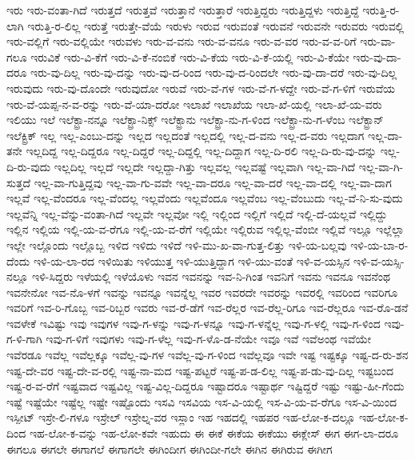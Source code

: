 {ಇರು
ಇರು-ವಂತಾ-ಗಿದೆ
ಇರುತ್ತದೆ
ಇರುತ್ತವೆ
ಇರುತ್ತಾನೆ
ಇರುತ್ತಾರೆ
ಇರುತ್ತಿದ್ದರು
ಇರುತ್ತಿದ್ದಳು
ಇರುತ್ತಿದ್ದೆ
ಇರುತ್ತಿ-ರ-ಲಾಗಿ
ಇರುತ್ತಿ-ರ-ಲಿಲ್ಲ
ಇರುತ್ತೆ
ಇರುತ್ತೇ-ವೆಯೆ
ಇರುಳು
ಇರುವ
ಇರುವಂತೆ
ಇರುವನೆ
ಇರುವನೇ
ಇರುವರು
ಇರುವಲ್ಲಿ
ಇರು-ವಲ್ಲಿಗೆ
ಇರು-ವಲ್ಲಿಯೇ
ಇರುವಳು
ಇರು-ವ-ವನು
ಇರು-ವ-ವನೂ
ಇರು-ವ-ವರ
ಇರು-ವ-ವ-ರಿಗೆ
ಇರು-ವಾ-ಗಲೂ
ಇರುವಿಕೆ
ಇರು-ವಿ-ಕೆಗೆ
ಇರು-ವಿ-ಕೆ-ನಂಬಿಕೆ
ಇರು-ವಿ-ಕೆಯ
ಇರು-ವಿ-ಕೆ-ಯಲ್ಲಿ
ಇರು-ವಿ-ಕೆಯೇ
ಇರು-ವು-ದಾ-ದರೂ
ಇರು-ವು-ದಿಲ್ಲ
ಇರು-ವು-ದನ್ನು
ಇರು-ವು-ದ-ರಿಂದ
ಇರು-ವು-ದ-ರಿಂದಲೇ
ಇರು-ವು-ದಾ-ದರೆ
ಇರು-ವು-ದಿಲ್ಲ
ಇರುವುದು
ಇರು-ವು-ದೊಂದೇ
ಇರುವುದೋ
ಇರುವೆ
ಇರು-ವೆ-ಗಳ
ಇರು-ವೆ-ಗ-ಳದ್ದೇ
ಇರು-ವೆ-ಗ-ಳಿಗೆ
ಇರುವೆಯ
ಇರು-ವೆ-ಯಪ್ಪ-ನ-ವ-ರನ್ನು
ಇರು-ವೆ-ಯಾ-ದರೋ
ಇಲಾಖೆ
ಇಲಾಖೆಯ
ಇಲಾ-ಖೆ-ಯಲ್ಲಿ
ಇಲಾ-ಖೆ-ಯ-ವರು
ಇಲಿಯು
ಇಲೆ
ಇಲೆಕ್ಟ್ರಾ-ನನ್ನೂ
ಇಲೆಕ್ಟ್ರಾ-ನಿಕ್ಸ್
ಇಲೆಕ್ಟ್ರಾನು
ಇಲೆಕ್ಟ್ರಾ-ನು-ಗ-ಳಿಂದ
ಇಲೆಕ್ಟ್ರಾ-ನು-ಗ-ಳೆಂಬ
ಇಲೆಕ್ಟ್ರಾನ್
ಇಲೆಕ್ಟ್ರಿಕ್
ಇಲ್ಲ
ಇಲ್ಲ-ಎಂಬು-ದನ್ನು
ಇಲ್ಲದ
ಇಲ್ಲದಂತೆ
ಇಲ್ಲದಲ್ಲಿ
ಇಲ್ಲ-ದ-ವನು
ಇಲ್ಲ-ದ-ವರು
ಇಲ್ಲದಾಗ
ಇಲ್ಲ-ದಾ-ತನೇ
ಇಲ್ಲದಿದ್ದ
ಇಲ್ಲ-ದಿದ್ದರೂ
ಇಲ್ಲ-ದಿದ್ದರೆ
ಇಲ್ಲ-ದಿದ್ದಲ್ಲಿ
ಇಲ್ಲ-ದಿದ್ದಾಗ
ಇಲ್ಲ-ದಿ-ರಲಿ
ಇಲ್ಲ-ದಿ-ರು-ವು-ದನ್ನು
ಇಲ್ಲ-ದಿ-ರು-ವುದು
ಇಲ್ಲದಿಲ್ಲ
ಇಲ್ಲದೆ
ಇಲ್ಲದೇ
ಇಲ್ಲದ್ದಾ-ಗಿತ್ತು
ಇಲ್ಲವಲ್ಲ
ಇಲ್ಲವಷ್ಟೆ
ಇಲ್ಲವಾಗಿ
ಇಲ್ಲ-ವಾ-ಗಿದೆ
ಇಲ್ಲ-ವಾ-ಗಿ-ಸುತ್ತದೆ
ಇಲ್ಲ-ವಾ-ಗುತ್ತಿದ್ದವು
ಇಲ್ಲ-ವಾ-ಗು-ವವೇ
ಇಲ್ಲ-ವಾ-ದರೂ
ಇಲ್ಲ-ವಾ-ದರೆ
ಇಲ್ಲ-ವಾ-ದಲ್ಲಿ
ಇಲ್ಲ-ವಾ-ದಾಗ
ಇಲ್ಲವೆ
ಇಲ್ಲ-ವೆಂದರೂ
ಇಲ್ಲ-ವೆಂದಲ್ಲ
ಇಲ್ಲವೆಂದು
ಇಲ್ಲವೆಂದೂ
ಇಲ್ಲವೆಂಬ
ಇಲ್ಲ-ವೆಂಬುದು
ಇಲ್ಲ-ವೆ-ನಿ-ಸು-ವುದು
ಇಲ್ಲವೆನ್ನಿ
ಇಲ್ಲ-ವೆನ್ನು-ವಂತಾ-ಗಿದೆ
ಇಲ್ಲವೇ
ಇಲ್ಲವೋ
ಇಲ್ಲಿ
ಇಲ್ಲಿಂದ
ಇಲ್ಲಿಗೆ
ಇಲ್ಲಿದೆ
ಇಲ್ಲಿ-ದೆ-ಯಲ್ಲವೆ
ಇಲ್ಲಿದ್ದು
ಇಲ್ಲಿನ
ಇಲ್ಲಿಯ
ಇಲ್ಲಿ-ಯ-ವ-ರೆಗೂ
ಇಲ್ಲಿ-ಯ-ವ-ರೆಗೆ
ಇಲ್ಲಿಯೇ
ಇಲ್ಲಿರುವ
ಇಲ್ಲಿಲ್ಲ-ವೆಂಬೀ
ಇಲ್ಲಿವೆ
ಇಲ್ಲೂ
ಇಲ್ಲೆಲ್ಲಾ
ಇಲ್ಲೇ
ಇಲ್ಲೊಂದು
ಇಲ್ಲೊಬ್ಬ
ಇಳಿದ
ಇಳಿದು
ಇಳಿದೆ
ಇಳಿ-ಮು-ಖ-ವಾ-ಗುತ್ತ-ಲಿತ್ತು
ಇಳಿ-ಯ-ಬಲ್ಲವು
ಇಳಿ-ಯ-ಬಾ-ರ-ದೆಂದು
ಇಳಿ-ಯ-ಲಾ-ರದ
ಇಳಿಯಿತು
ಇಳಿಯುತ್ತ
ಇಳಿ-ಯುತ್ತಿದ್ದಾಗ
ಇಳಿ-ಯು-ವಂತೆ
ಇಳಿ-ವ-ಯಸ್ಸಿನ
ಇಳಿ-ವ-ಯಸ್ಸಿ-ನಲ್ಲೂ
ಇಳಿ-ಸಿದ್ದರು
ಇಳೆಯಲ್ಲಿ
ಇಳೆಯೊಳು
ಇವನ
ಇವನನ್ನು
ಇವ-ನಿ-ಗಿಂತ
ಇವನಿಗೆ
ಇವನು
ಇವನೂ
ಇವನೆಂಥ
ಇವನೇನೋ
ಇವ-ನೊ-ಳಗೆ
ಇವನ್ನು
ಇವನ್ನೂ
ಇವನ್ನೆಲ್ಲ
ಇವರ
ಇವರದೇ
ಇವರನ್ನು
ಇವರಲ್ಲಿ
ಇವರಿಂದ
ಇವರಿಗೂ
ಇವರಿಗೆ
ಇವ-ರಿ-ಗೊಬ್ಬ
ಇವ-ರಿಬ್ಬರ
ಇವರು
ಇವ-ರೆ-ಡೆಗೆ
ಇವ-ರೆಲ್ಲರ
ಇವ-ರೆಲ್ಲ-ರಿಗೂ
ಇವ-ರೆಲ್ಲರೂ
ಇವ-ರೊ-ಡನೆ
ಇವಳೇಕೆ
ಇವಿಷ್ಟು
ಇವು
ಇವುಗಳ
ಇವು-ಗ-ಳನ್ನು
ಇವು-ಗ-ಳನ್ನೂ
ಇವು-ಗ-ಳನ್ನೆಲ್ಲ
ಇವು-ಗ-ಳಲ್ಲಿ
ಇವು-ಗ-ಳಿಂದ
ಇವು-ಗ-ಳಿ-ಗಾಗಿ
ಇವು-ಗ-ಳಿಗೆ
ಇವುಗಳು
ಇವು-ಗ-ಳೆಲ್ಲ
ಇವು-ಗ-ಳೊ-ಡ-ನೆಯೇ
ಇವೂ
ಇವೆ
ಇವೆಅಂಥ
ಇವೆಯೇ
ಇವೆರಡೂ
ಇವೆಲ್ಲ
ಇವೆಲ್ಲಕ್ಕೂ
ಇವೆಲ್ಲ-ವು-ಗಳ
ಇವೆಲ್ಲ-ವು-ಗ-ಳಿಂದ
ಇವೆಲ್ಲವೂ
ಇವೇ
ಇಷ್ಟ
ಇಷ್ಟಕ್ಕೂ
ಇಷ್ಟ-ದ-ರು-ಶನ
ಇಷ್ಟ-ದೇ-ವರ
ಇಷ್ಟ-ದೇ-ವ-ರಲ್ಲಿ
ಇಷ್ಟ-ನಾ-ಮದ
ಇಷ್ಟ-ಪಟ್ಟರೆ
ಇಷ್ಟ-ಪ-ಡ-ಲಿಲ್ಲ
ಇಷ್ಟ-ಪ-ಡು-ವು-ದಿಲ್ಲ
ಇಷ್ಟಬಂದ
ಇಷ್ಟ-ರ-ವ-ರೆಗೆ
ಇಷ್ಟವಾದ
ಇಷ್ಟವಿಲ್ಲ
ಇಷ್ಟ-ವಿಲ್ಲ-ದಿದ್ದರೂ
ಇಷ್ಟಾದರೂ
ಇಷ್ಟಾರ್ಥ
ಇಷ್ಟಿದ್ದರೆ
ಇಷ್ಟು
ಇಷ್ಟು-ಹೀ-ಗೆಂದು
ಇಷ್ಟೆ
ಇಷ್ಟೆಯೇ
ಇಷ್ಟೆಲ್ಲ
ಇಷ್ಟೇ
ಇಷ್ಟೊಂದು
ಇಸವಿ
ಇಸವಿಯ
ಇಸ-ವಿ-ಯಲ್ಲಿ
ಇಸ-ವಿ-ಯ-ವ-ರೆಗೂ
ಇಸ-ವಿ-ಯಿಂದ
ಇಸ್ಪೀಟ್
ಇಸ್ರೇ-ಲಿ-ಗಳೂ
ಇಸ್ರೇಲ್
ಇಸ್ರೇಲ್ನ-ವರ
ಇಸ್ಲಾಂ
ಇಹ
ಇಹದಲ್ಲಿ
ಇಹಪರ
ಇಹ-ಲೋ-ಕ-ದಲ್ಲೂ
ಇಹ-ಲೋ-ಕ-ದಿಂದ
ಇಹ-ಲೋ-ಕ-ವನ್ನು
ಇಹ-ಲೋ-ಕವೇ
ಇಹುದು
ಈ
ಈಕೆ
ಈಕೆಯ
ಈಕೆಯು
ಈಕ್ಲೇಸ್
ಈಗ
ಈಗ-ಲಾ-ದರೂ
ಈಗಲೂ
ಈಗಲೇ
ಈಗಾಗಲೆ
ಈಗಾಗಲೇ
ಈಗಿಂದೀಗ
ಈಗಿಂದೀ-ಗಲೇ
ಈಗಿನ
ಈಗಿರುವ
ಈಗೀಗ
}
